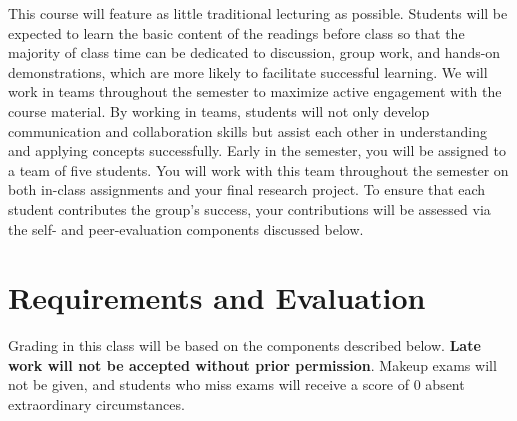 \documentclass[11pt]{article}
\begin{document}
This course will feature as little traditional lecturing as
possible. Students will be expected to learn the basic content of the
readings before class so that the majority of class time can be
dedicated to discussion, group work, and hands-on demonstrations,
which are more likely to facilitate successful learning. We will work
in teams throughout the semester to maximize active engagement with the
course material. By working in teams, students will not only develop
communication and collaboration skills but assist each other in
understanding and applying concepts successfully. Early in the
semester, you will be assigned to a team of five students.  You will
work with this team throughout the semester on both in-class
assignments and your final research project. To ensure that each
student contributes the group's success, your contributions will be
assessed via the self- and peer-evaluation components discussed below.





\section*{Requirements and Evaluation}





Grading in this class will be based on the components described
below. \textbf{Late work will not be accepted without prior
  permission}. Makeup exams will not be given, and students who miss
exams will receive a score of 0 absent extraordinary circumstances.
\end{document}
